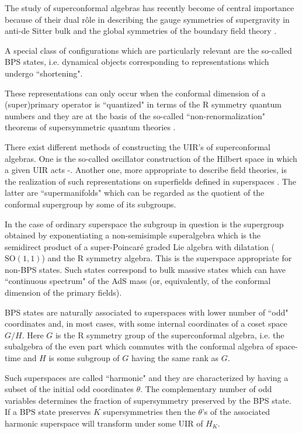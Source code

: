 \documentclass[a4paper,12pt]{article}
\begin{document}
The study of superconformal algebras has recently become of 
central importance because of their dual r\^ole in describing the 
gauge symmetries of supergravity in anti-de Sitter bulk and the 
global symmetries of the boundary field theory \cite{mal,gkp,wit}. 

A special class of configurations which are particularly relevant 
are the so-called BPS states, i.e. dynamical objects corresponding 
to representations which undergo ``shortening". 

These representations can only occur when the conformal dimension 
of a (super)primary operator is ``quantized" in terms of the R 
symmetry quantum numbers and they are at the basis of the 
so-called ``non-renormalization" theorems of supersymmetric 
quantum theories \cite{FIZ}. 

There exist different methods of constructing the UIR's of 
superconformal algebras. One is the so-called oscillator 
construction of the Hilbert space in which a given UIR acts 
\cite{bgg}-\cite{gmz2}. Another one, more appropriate to describe 
field theories, is the realization of such representations on 
superfields defined in superspaces \cite{SS,fwz}. The latter are 
``supermanifolds" which can be regarded as the quotient of the 
conformal supergroup by some of its subgroups. 

In the case of ordinary superspace the subgroup in question is the 
supergroup obtained by exponentiating a non-semisimple 
superalgebra which is the semidirect product of a super-Poincar\'{e} 
graded Lie algebra with dilatation ($\mbox{SO}(1,1)$) and the R 
symmetry algebra. This is the superspace appropriate for non-BPS 
states. Such states correspond to bulk massive states which can 
have ``continuous spectrum" of the AdS mass (or, equivalently, of 
the conformal dimension of the primary fields). 

BPS states are naturally associated to superspaces with lower 
number of ``odd" coordinates and, in most cases, with some 
internal coordinates of a coset space $G/H$. Here $G$ is the R 
symmetry group of the superconformal algebra, i.e. the subalgebra 
of the even part which commutes with the conformal algebra of 
space-time and $H$ is some subgroup of $G$ having the same rank as 
$G$.  

Such superspaces are called ``harmonic" \cite{GIK1} and they are 
characterized by having a subset of the initial odd coordinates 
$\theta$. The complementary number of odd variables determines the 
fraction of supersymmetry preserved by the BPS state. If a BPS 
state preserves $K$ supersymmetries then the $\theta$'s of the 
associated harmonic superspace will transform under some UIR of 
$H_K$. 
\end{document}

